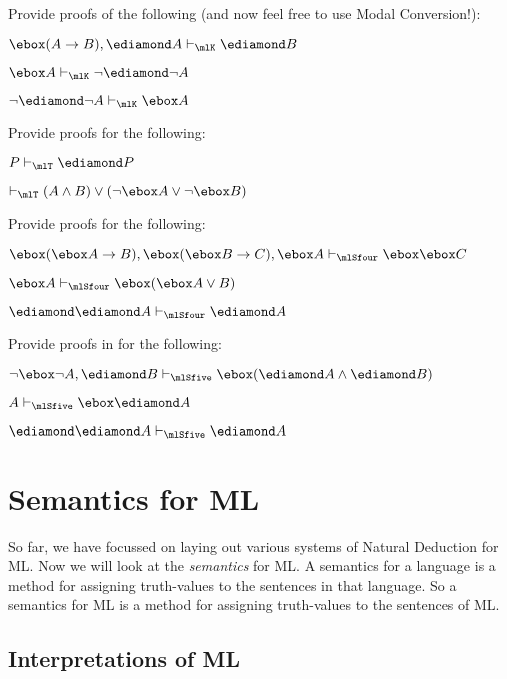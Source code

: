 \problempart
Provide proofs of the following (and now feel free to use Modal Conversion!):
\begin{earg}
	\item $\ebox(A\eif B), \ediamond A \proves_\mlK \ediamond B$
	\item $\ebox A \proves_\mlK \enot\ediamond\enot A$
	\item $\enot\ediamond\enot A \proves_\mlK \ebox A$
\end{earg}

\problempart
Provide proofs for the following:
\begin{earg}
	\item $P\proves_\mlT\ediamond P$
	\item $\proves_\mlT (A\eand B)\eor(\enot \ebox A\eor\enot\ebox B)$
\end{earg}

\problempart
Provide proofs for the following:
\begin{earg}
	\item $\ebox(\ebox A\eif B), \ebox (\ebox B\eif C), \ebox A \proves_\mlSfour \ebox\ebox C$
	\item $\ebox A \proves_\mlSfour \ebox(\ebox A \eor B)$
	\item $\ediamond \ediamond A \proves_\mlSfour \ediamond A$
\end{earg}


\problempart
Provide proofs in \mlSfive{} for the following:
\begin{earg}
	\item $\enot\ebox\enot A, \ediamond B\proves_\mlSfive \ebox(\ediamond A \eand \ediamond B)$
	\item $A \proves_\mlSfive  \ebox\ediamond A$
	\item $\ediamond\ediamond A\proves_\mlSfive  \ediamond A$
\end{earg}


\chapter{Semantics for ML}
\label{Semantics}

So far, we have focussed on laying out various systems of Natural Deduction for ML. Now we will look at the \emph{semantics} for ML. A semantics for a language is a method for assigning truth-values to the sentences in that language. So a semantics for ML is a method for assigning truth-values to the sentences of ML.

\section{Interpretations of ML}

